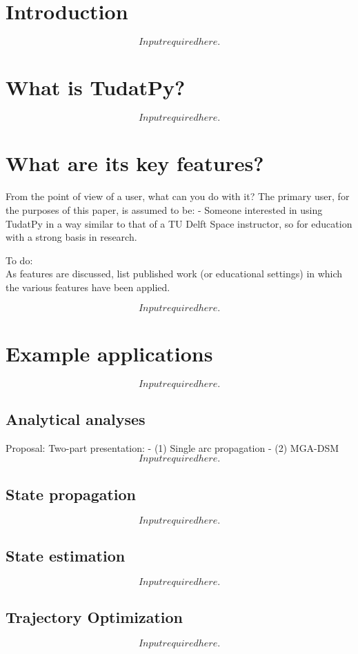 \documentclass[]{IAC_style}
\begin{document}
\section{Introduction}
    \[Input required here.\]

\section{What is TudatPy?}
    \[Input required here.\]

\section{What are its key features?}

    From the point of view of a user, what can you do with it?
    The primary user, for the purposes of this paper, is assumed to be:
    - Someone interested in using TudatPy in a way similar to that of a TU Delft Space instructor, so for education with a strong basis in research.

    To do:
    \[ \] As features are discussed, list published work (or educational settings) in which the various features have been applied.

    \[Input required here.\]

\section{Example applications}
    \[Input required here.\]

    \subsection{Analytical analyses}
    Proposal: Two-part presentation:
    - (1) Single arc propagation
    - (2) MGA-DSM
    \[Input required here.\]

    \subsection{State propagation}
    \[Input required here.\]

    \subsection{State estimation}
    \[Input required here.\]

    \subsection{Trajectory Optimization}
    \[Input required here.\]
\end{document}
